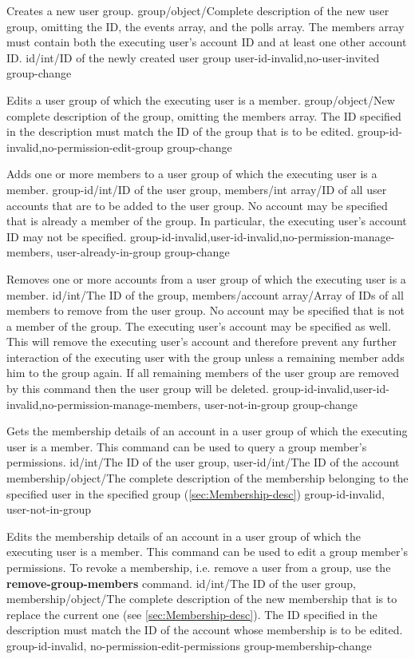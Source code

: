 \documentclass[parskip=full,11pt]{scrartcl}
\begin{document}
{Creates a new user group.}
{group/object/Complete description of the new user group{,} omitting the ID{,}
the events array{,} and the polls array.
The members array must contain both the executing user's account ID and at
least one other account ID.}
{id/int/ID of the newly created user group}
{user-id-invalid,no-user-invited}
{group-change}

{Edits a user group of which the executing user is a member.}
{group/object/New complete description of the group{,} omitting the members
array.
The ID specified in the description must match the ID of the group that
is to be edited.}
{}
{group-id-invalid,no-permission-edit-group}
{group-change}

{Adds one or more members to a user group of which the executing user is a
member.}
{group-id/int/ID of the user group,
members/int array/ID of all user accounts that are to be added to the user
group.
No account may be specified that is already a member of the group.
In particular{,} the executing user's account ID may not be specified.}
{}
{group-id-invalid,user-id-invalid,no-permission-manage-members,%
user-already-in-group}
{group-change}

{Removes one or more accounts from a user group of which the executing user is
a member.}
{id/int/The ID of the group,
members/account array/Array of IDs of all members to remove from the user
group.
No account may be specified that is not a member of the group.
The executing user's account may be specified as well.
This will remove the executing user's account and therefore prevent any further
interaction of the executing user with the group unless a remaining member adds
him to the group again.
If all remaining members of the user group are removed by this command then the
user group will be deleted.}
{}
{group-id-invalid,user-id-invalid,no-permission-manage-members,
user-not-in-group}
{group-change}

{Gets the membership details of an account in a user group of which the
executing user is a member.
This command can be used to query a group member's permissions.}
{id/int/The ID of the user group,
user-id/int/The ID of the account}
{membership/object/The complete description of the membership belonging to
the specified user in the specified group (\ref{sec:Membership-desc})}
{group-id-invalid, user-not-in-group}
{}

{Edits the membership details of an account in a user group of which the
executing user is a member.
This command can be used to edit a group member's permissions.
To revoke a membership, i.e. remove a user from a group, use the
\textbf{remove-group-members} command.}
{id/int/The ID of the user group,
membership/object/The complete description of the new membership that is to
replace the current one (see \ref{sec:Membership-desc}).
The ID specified in the description must match the ID of the account whose
membership is to be edited.}
{}
{group-id-invalid, no-permission-edit-permissions}
{group-membership-change}
\end{document}
